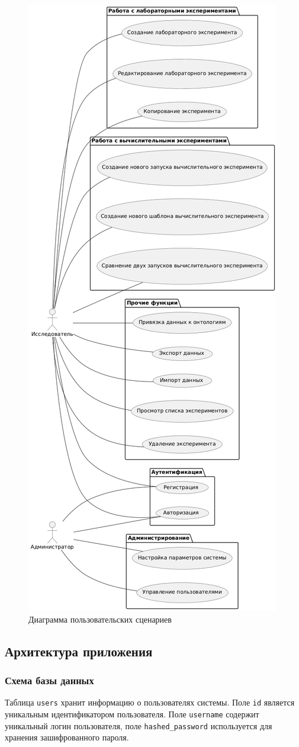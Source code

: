 \begin{figure}[H]
    \centering
    \includegraphics[width=0.5\linewidth]{img/use_cases.png}
    \caption{Диаграмма пользовательских сценариев}
    \label{pic:uc}
\end{figure}

\subsection{Архитектура приложения}

\subsubsection{Схема базы данных}

Таблица \texttt{users} хранит информацию о пользователях системы. Поле \texttt{id} является уникальным идентификатором пользователя. Поле \texttt{username} содержит уникальный логин пользователя, поле \texttt{hashed\_password} используется для хранения зашифрованного пароля.


